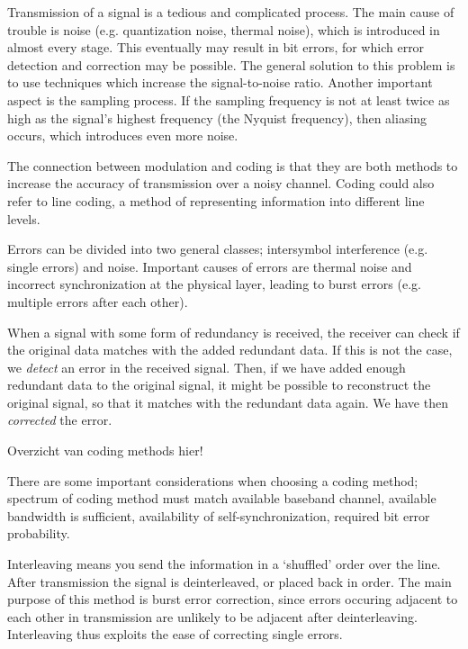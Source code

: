 \documentclass[11pt,titlepage]{report}
\begin{document}
Transmission of a signal is a tedious and complicated process. The main cause of trouble is noise (e.g. quantization noise, thermal noise), which is introduced in almost every stage. This eventually may result in bit errors, for which error detection and correction may be possible. The general solution to this problem is to use techniques which increase the signal-to-noise ratio. Another important aspect is the sampling process. If the sampling frequency is not at least twice as high as the signal's highest frequency (the Nyquist frequency), then aliasing occurs, which introduces even more noise.

The connection between modulation and coding is that they are both methods to increase the accuracy of transmission over a noisy channel. Coding could also refer to line coding, a method of representing information into different line levels.

Errors can be divided into two general classes; intersymbol interference (e.g. single errors) and noise. Important causes of errors are thermal noise and incorrect synchronization at the physical layer, leading to burst errors (e.g. multiple errors after each other).

When a signal with some form of redundancy is received, the receiver can check if the original data matches with the added redundant data. If this is not the case, we \emph{detect} an error in the received signal. Then, if we have added enough redundant data to the original signal, it might be possible to reconstruct the original signal, so that it matches with the redundant data again. We have then \emph{corrected} the error.

Overzicht van coding methods hier!

There are some important considerations when choosing a coding method; spectrum of coding method must match available baseband channel, available bandwidth is sufficient, availability of self-synchronization, required bit error probability.

Interleaving means you send the information in a `shuffled' order over the line. After transmission the signal is deinterleaved, or placed back in order. The main purpose of this method is burst error correction, since errors occuring adjacent to each other in transmission are unlikely to be adjacent after deinterleaving. Interleaving thus exploits the ease of correcting single errors.
\end{document}
